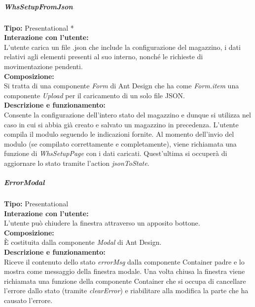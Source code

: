 \subparagraph{\colorbox{verde_uml}{WhsSetupFromJson}} 
\textbf{Tipo:} Presentational * \\
\textbf{Interazione con l'utente:} \\
L'utente carica un file .json che include la configurazione del magazzino, i dati relativi agli elementi presenti al suo interno, nonché le richieste di movimentazione pendenti. \\
\textbf{Composizione:} \\
Si tratta di una componente \textit{Form} di Ant Design che ha come \textit{Form.item} una componente \textit{Upload} per il caricamento di un solo file JSON. \\
\textbf{Descrizione e funzionamento:} \\
Consente la configurazione dell'intero stato del magazzino e dunque si utilizza nel caso in cui si abbia già creato e salvato un magazzino in precedenza.
L'utente compila il modulo seguendo le indicazioni fornite. Al momento dell'invio del modulo (se compilato correttamente e completamente), viene richiamata una funzione di \textit{WhsSetupPage} con i dati caricati. Quest'ultima si occuperà di aggiornare lo stato tramite l'action \textit{jsonToState}.

\subparagraph{\colorbox{verde_uml}{ErrorModal}}\label{errorModal}
\textbf{Tipo:} Presentational \\
\textbf{Interazione con l'utente:} \\
L'utente può chiudere la finestra attraverso un apposito bottone.\\
\textbf{Composizione:} \\
È costituita dalla componente \textit{Modal} di Ant Design. \\
\textbf{Descrizione e funzionamento:} \\
Riceve il contenuto dello stato \textit{errorMsg} dalla componente Container padre e lo mostra come messaggio della finestra modale. Una volta chiusa la finestra viene richiamata una funzione della componente Container che si occupa di cancellare l'errore dallo stato (tramite \textit{clearError}) e riabilitare alla modifica la parte che ha causato l'errore.

